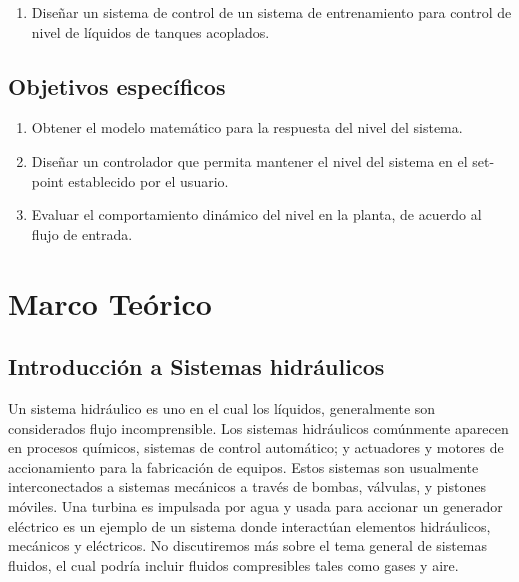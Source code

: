 \documentclass[a4paper,12pt,twoside]{proyectotanquesecci}
\begin{document}
\begin{enumerate}
\item Diseñar un sistema de control de un sistema de entrenamiento para control de nivel de líquidos de tanques acoplados.
\end{enumerate}

\section{Objetivos específicos}

\begin{enumerate}
\item Obtener el modelo matemático para la respuesta del nivel del sistema.
\item Diseñar un controlador que permita mantener el nivel del sistema en el set-point establecido por el usuario.
\item Evaluar el comportamiento dinámico del nivel en la planta, de acuerdo al flujo de entrada.
\end{enumerate}






\chapter{Marco Teórico}

\section{Introducción a Sistemas hidráulicos}

Un sistema hidráulico es uno en el cual los líquidos, generalmente son considerados flujo incomprensible. Los sistemas hidráulicos comúnmente aparecen en procesos químicos, sistemas de control automático; y actuadores y motores de accionamiento para la fabricación de equipos. Estos sistemas son usualmente interconectados a sistemas mecánicos a través de bombas, válvulas, y pistones móviles. Una turbina es impulsada por agua y usada para accionar un generador eléctrico es un ejemplo de un sistema donde interactúan elementos hidráulicos, mecánicos y eléctricos. No discutiremos más sobre el tema general de sistemas fluidos, el cual podría incluir fluidos compresibles tales como gases y aire. \\
\end{document}
